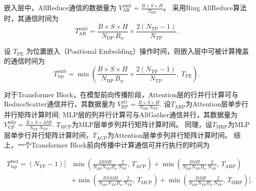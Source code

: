 嵌入层中，AllReduce通信的数据量为
$
V_{\mathrm{AR}}^{\mathrm{emb}}
= \frac{B \times S \times H}{N_{\mathrm{DP}}}
$。
采用Ring AllReduce算法时，其通信时间为
\begin{equation}
  T_{\mathrm{AR}}^{\mathrm{emb}}
  = \frac{B \times S \times H}{N_{\mathrm{DP}} \, B_w}
    \times \frac{2\left(N_{\mathrm{TP}} - 1\right)}{N_{\mathrm{TP}}}.
\end{equation}

设 $T_{\mathrm{PE}}$ 为位置嵌入（Positional Embedding）操作时间，则嵌入层中可被计算掩盖的通信时间为
\begin{equation}
  T_{\mathrm{lap}}^{\mathrm{emb}}
  = \min\!\left(
      \frac{B \times S \times H}{N_{\mathrm{DP}} \, B_w}
      \times \frac{2\left(N_{\mathrm{TP}} - 1\right)}{N_{\mathrm{TP}}},
      \; T_{\mathrm{PE}}
    \right).
\end{equation}

\medskip

对于Transformer Block，在模型前向传播阶段，Attention层的行并行计算可与ReduceScatter通信并行，其数据量为
$
V_{\mathrm{RP}}^{\mathrm{att}}
= \frac{B \times S \times H}{N_{\mathrm{DP}} \, N_{\mathrm{TP}}}.
$
设$T_{\mathrm{ARP}}$为Attention层单步行并行矩阵计算时间;
MLP层的列并行计算可与AllGather通信并行，其数据量为
$
V_{\mathrm{CP}}^{\mathrm{mlp}}
= \frac{B \times S \times M H}{N_{\mathrm{DP}} \, N_{\mathrm{TP}}}.
$
$T_{\mathrm{MCP}}$为MLP层单步列并行矩阵计算时间。
同理，设$T_{\mathrm{MRP}}$为MLP层单步行并行矩阵计算时间，$T_{\mathrm{ACP}}$为Attention层单步列并行矩阵计算时间。
综上，一个Transformer Block前向传播中计算通信可并行执行的时间为

\begin{equation}
\begin{aligned}
T_{\mathrm{lap}}^{\mathrm{fwd}}
= (N_{\mathrm{TP}} - 1)\!\Big[
& \min\!\left(
\frac{3B S H}{N_{\mathrm{DP}} N_{\mathrm{TP}} B_w}\frac{2}{N_{\mathrm{TP}}},
\, T_{\mathrm{ACP}}
\right)
+ \min\!\left(
\frac{B S H}{N_{\mathrm{DP}} N_{\mathrm{TP}} B_w}\frac{2}{N_{\mathrm{TP}}},
\, T_{\mathrm{ARP}}
\right) \\
& + \min\!\left(
\frac{B S M H}{N_{\mathrm{DP}} N_{\mathrm{TP}} B_w}\frac{2}{N_{\mathrm{TP}}},
\, T_{\mathrm{MCP}}
\right)
+ \min\!\left(
\frac{B S H}{N_{\mathrm{DP}} N_{\mathrm{TP}} B_w}\frac{2}{N_{\mathrm{TP}}},
\, T_{\mathrm{MRP}}
\right)
\Big].
\end{aligned}
\end{equation}

